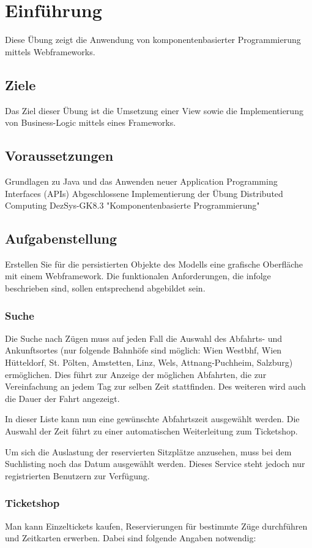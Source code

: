 \section{Einführung}
Diese Übung zeigt die Anwendung von komponentenbasierter Programmierung mittels Webframeworks.
\subsection{Ziele}

Das Ziel dieser Übung ist die Umsetzung einer View sowie die Implementierung von Business-Logic mittels eines Frameworks.
\subsection{Voraussetzungen} 

Grundlagen zu Java und das Anwenden neuer Application Programming Interfaces (APIs)
Abgeschlossene Implementierung der Übung Distributed Computing DezSys-GK8.3 "Komponentenbasierte Programmierung"
\subsection{Aufgabenstellung}

Erstellen Sie für die persistierten Objekte des Modells eine grafische Oberfläche mit einem Webframework. Die funktionalen Anforderungen, die infolge beschrieben sind, sollen entsprechend abgebildet sein.

\subsubsection{Suche}
Die Suche nach Zügen muss auf jeden Fall die Auswahl des Abfahrts- und Ankunftsortes (nur folgende Bahnhöfe sind möglich: Wien Westbhf, Wien Hütteldorf, St. Pölten, Amstetten, Linz, Wels, Attnang-Puchheim, Salzburg) ermöglichen. Dies führt zur Anzeige der möglichen Abfahrten, die zur Vereinfachung an jedem Tag zur selben Zeit stattfinden. Des weiteren wird auch die Dauer der Fahrt angezeigt.

In dieser Liste kann nun eine gewünschte Abfahrtszeit ausgewählt werden. Die Auswahl der Zeit führt zu einer automatischen Weiterleitung zum Ticketshop.

Um sich die Auslastung der reservierten Sitzplätze anzusehen, muss bei dem Suchlisting noch das Datum ausgewählt werden. Dieses Service steht jedoch nur registrierten Benutzern zur Verfügung.


\subsubsection{Ticketshop}
Man kann Einzeltickets kaufen, Reservierungen für bestimmte Züge durchführen und Zeitkarten erwerben. Dabei sind folgende Angaben notwendig:


